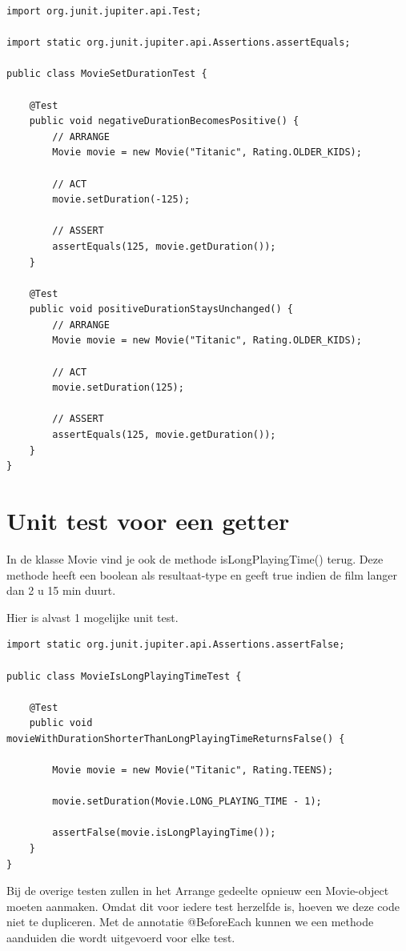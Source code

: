 \begin{lstlisting}
import org.junit.jupiter.api.Test;

import static org.junit.jupiter.api.Assertions.assertEquals;

public class MovieSetDurationTest {

	@Test
	public void negativeDurationBecomesPositive() {
		// ARRANGE
		Movie movie = new Movie("Titanic", Rating.OLDER_KIDS);

		// ACT
		movie.setDuration(-125);

		// ASSERT
		assertEquals(125, movie.getDuration());
	}

	@Test
	public void positiveDurationStaysUnchanged() {
		// ARRANGE
		Movie movie = new Movie("Titanic", Rating.OLDER_KIDS);

		// ACT
		movie.setDuration(125);

		// ASSERT
		assertEquals(125, movie.getDuration());
	}
}
\end{lstlisting}

\clearpage

\section{Unit test voor een getter}

In de klasse Movie vind je ook de methode isLongPlayingTime() terug. Deze methode heeft een boolean als resultaat-type en geeft true indien de film langer dan 2 u 15 min duurt.

Hier is alvast 1 mogelijke unit test.

\begin{lstlisting}
import static org.junit.jupiter.api.Assertions.assertFalse;

public class MovieIsLongPlayingTimeTest {
	
	@Test
	public void movieWithDurationShorterThanLongPlayingTimeReturnsFalse() {
		
		Movie movie = new Movie("Titanic", Rating.TEENS);
		
		movie.setDuration(Movie.LONG_PLAYING_TIME - 1);
		
		assertFalse(movie.isLongPlayingTime());
	}
}
\end{lstlisting}

Bij de overige testen zullen in het Arrange gedeelte opnieuw een Movie-object moeten aanmaken. Omdat dit voor iedere test herzelfde is, hoeven we deze code niet te dupliceren. 
Met de annotatie @BeforeEach kunnen we een methode aanduiden die wordt uitgevoerd voor elke test.

